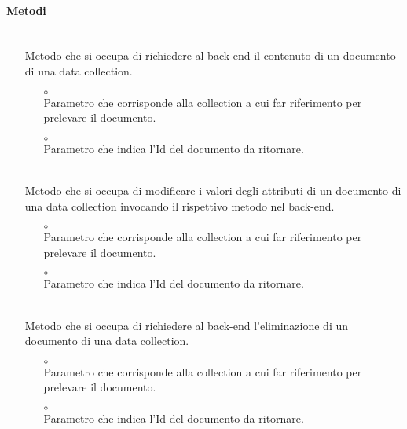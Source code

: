 \paragraph*{Metodi}
\begin{itemize}
\item[]  \\ Metodo che si occupa di richiedere al back-end il contenuto di un documento di una data collection.
\begin{itemize}\addtolength{\itemsep}{-0.5\baselineskip}
\item[$\circ$]  \\ Parametro che corrisponde alla collection a cui far riferimento per prelevare il documento.
\item[$\circ$]  \\ Parametro che indica l'Id del documento da ritornare.
\end{itemize}
\item[]  \\ Metodo che si occupa di modificare i valori degli attributi di un documento di una data collection invocando il rispettivo metodo nel back-end.
\begin{itemize}\addtolength{\itemsep}{-0.5\baselineskip}
\item[$\circ$]  \\ Parametro che corrisponde alla collection a cui far riferimento per prelevare il documento.
\item[$\circ$]  \\ Parametro che indica l'Id del documento da ritornare.
\end{itemize}
\item[]  \\ Metodo che si occupa di richiedere al back-end l'eliminazione di un documento di una data collection.
\begin{itemize}\addtolength{\itemsep}{-0.5\baselineskip}
\item[$\circ$]  \\ Parametro che corrisponde alla collection a cui far riferimento per prelevare il documento.
\item[$\circ$]  \\ Parametro che indica l'Id del documento da ritornare.
\end{itemize}
\end{itemize}

